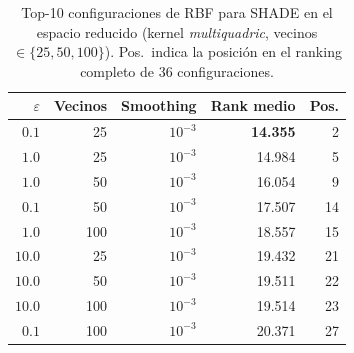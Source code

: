 \begin{table}[H]
    \centering
    \small
    \setlength{\tabcolsep}{5pt}
    \begin{tabular}{rrr|rr}
        \toprule
        \textbf{$\varepsilon$} & \textbf{Vecinos} & \textbf{Smoothing} & \textbf{Rank medio} & \textbf{Pos.} \\
        \midrule
        $0.1$ & 25 & $10^{-3}$ & \textbf{14.355} & 2 \\
        $1.0$ & 25 & $10^{-3}$ & 14.984 & 5 \\
        $1.0$ & 50 & $10^{-3}$ & 16.054 & 9 \\
        $0.1$ & 50 & $10^{-3}$ & 17.507 & 14 \\
        $1.0$ & 100 & $10^{-3}$ & 18.557 & 15 \\
        $10.0$ & 25 & $10^{-3}$ & 19.432 & 21 \\
        $10.0$ & 50 & $10^{-3}$ & 19.511 & 22 \\
        $10.0$ & 100 & $10^{-3}$ & 19.514 & 23 \\
        $0.1$ & 100 & $10^{-3}$ & 20.371 & 27 \\
        \bottomrule
    \end{tabular}
    \caption{Top-10 configuraciones de RBF para SHADE en el espacio reducido (kernel \textit{multiquadric}, vecinos $\in\{25, 50, 100\}$). Pos.\ indica la posición en el ranking completo de 36 configuraciones.}
    \label{tab:rbf_apendice_shade}
\end{table}
